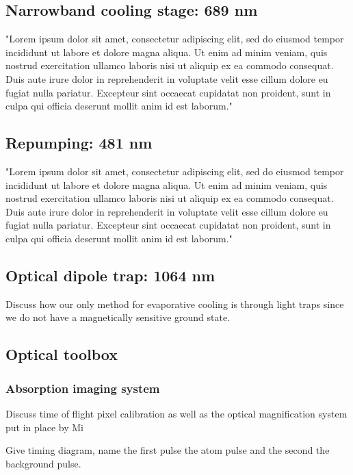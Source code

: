 \subsection{Narrowband cooling stage: 689 nm}
\label{ssec:689sys}

"Lorem ipsum dolor sit amet, consectetur adipiscing elit, sed do eiusmod tempor incididunt ut labore et dolore magna aliqua. Ut enim ad minim veniam, quis nostrud exercitation ullamco laboris nisi ut aliquip ex ea commodo consequat. Duis aute irure dolor in reprehenderit in voluptate velit esse cillum dolore eu fugiat nulla pariatur. Excepteur sint occaecat cupidatat non proident, sunt in culpa qui officia deserunt mollit anim id est laborum."

\subsection{Repumping: 481 nm}
\label{ssec:481sys}

"Lorem ipsum dolor sit amet, consectetur adipiscing elit, sed do eiusmod tempor incididunt ut labore et dolore magna aliqua. Ut enim ad minim veniam, quis nostrud exercitation ullamco laboris nisi ut aliquip ex ea commodo consequat. Duis aute irure dolor in reprehenderit in voluptate velit esse cillum dolore eu fugiat nulla pariatur. Excepteur sint occaecat cupidatat non proident, sunt in culpa qui officia deserunt mollit anim id est laborum."

\subsection{Optical dipole trap: 1064 nm}
\label{ssec:1064sys}

Discuss how our only method for evaporative cooling is through light traps since we do not have a magnetically sensitive ground state.

\subsection{Optical toolbox}
\label{ssec:op_tools}

\subsubsection{Absorption imaging system}

Discuss time of flight pixel calibration as well as the optical magnification system put in place by Mi

Give timing diagram, name the first pulse the atom pulse and the second the background pulse.

